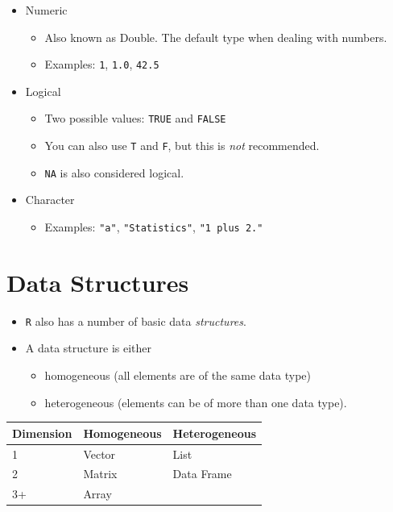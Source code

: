 \documentclass[]{book}
\providecommand{\tightlist}{%
  \setlength{\itemsep}{0pt}\setlength{\parskip}{0pt}}
\begin{document}
\begin{itemize}
\tightlist
\item
  Numeric

  \begin{itemize}
  \tightlist
  \item
    Also known as Double. The default type when dealing with numbers.
  \item
    Examples: \texttt{1}, \texttt{1.0}, \texttt{42.5}
  \end{itemize}
\item
  Logical

  \begin{itemize}
  \tightlist
  \item
    Two possible values: \texttt{TRUE} and \texttt{FALSE}
  \item
    You can also use \texttt{T} and \texttt{F}, but this is \emph{not}
    recommended.
  \item
    \texttt{NA} is also considered logical.
  \end{itemize}
\item
  Character

  \begin{itemize}
  \tightlist
  \item
    Examples: \texttt{"a"}, \texttt{"Statistics"},
    \texttt{"1\ plus\ 2."}
  \end{itemize}
\end{itemize}

\section{Data Structures}\label{data-structures}

\begin{itemize}
\tightlist
\item
  \texttt{R} also has a number of basic data \emph{structures}.
\item
  A data structure is either

  \begin{itemize}
  \tightlist
  \item
    homogeneous (all elements are of the same data type)
  \item
    heterogeneous (elements can be of more than one data type).
  \end{itemize}
\end{itemize}

\begin{longtable}[]{@{}lll@{}}
\toprule
Dimension & \textbf{Homogeneous} & \textbf{Heterogeneous}\tabularnewline
\midrule
\endhead
1 & Vector & List\tabularnewline
2 & Matrix & Data Frame\tabularnewline
3+ & Array &\tabularnewline
\bottomrule
\end{longtable}
\end{document}
